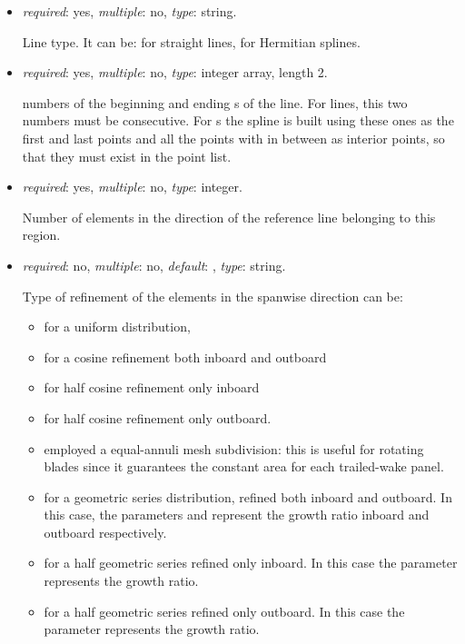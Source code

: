 \begin{itemize}

\item {} \textit{required}: yes, \textit{multiple}: no, \textit{type}: string.

    Line type. It can be:  for straight lines, 
     for Hermitian splines.

\item {}  \textit{required}: yes, \textit{multiple}: no, 
\textit{type}: integer array, length 2.

     numbers of the beginning and ending s of the line. 
    For  lines, this two numbers must be consecutive. 
    For s the spline is built using these ones as the first 
    and last points and all the points with  in between as interior 
    points, so that they must exist in the point list.

\item {}  \textit{required}: yes, \textit{multiple}: no, \textit{type}: integer.

    Number of elements in the direction of the reference line belonging 
    to this region.

\item {} \textit{required}: no, \textit{multiple}: no, 
\textit{default}: , \textit{type}: string.

    Type of refinement of the elements in the spanwise direction can be: 
    \begin{itemize}
      \item {} for a uniform distribution, 
      \item {} for a cosine refinement both inboard and outboard
      \item {} for half cosine refinement only inboard
      \item {} for half cosine refinement only outboard. 
      \item {} employed a equal-annuli mesh subdivision: this is useful for rotating 
      blades since it guarantees the constant area for each trailed-wake panel.
      \item {} for a geometric series distribution, refined both inboard and outboard.
      In this case, the parameters  and  represent the growth ratio inboard and outboard respectively. 
      \item {} for a half geometric series refined only inboard.
      In this case the parameter  represents the growth ratio.
      \item {} for a half geometric series refined only outboard.
      In this case the parameter  represents the growth ratio.  
    \end{itemize} 
  

\end{itemize}
